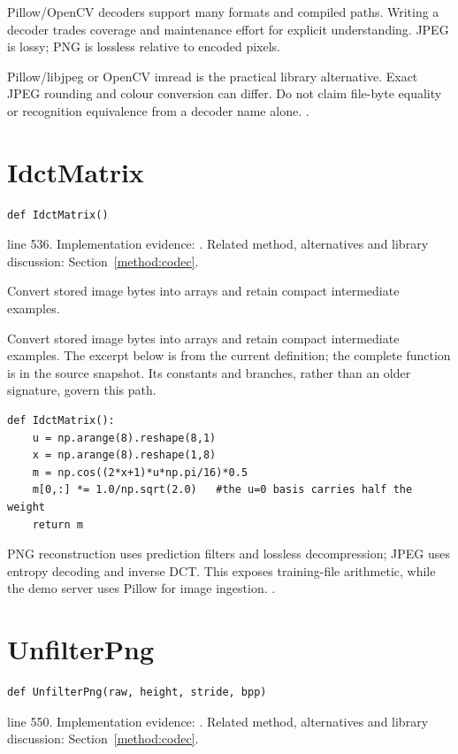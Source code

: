 Pillow/OpenCV decoders support many formats and compiled paths. Writing a decoder trades coverage and maintenance effort for explicit understanding. JPEG is lossy; PNG is lossless relative to encoded pixels.


Pillow/libjpeg or OpenCV imread is the practical library alternative. Exact JPEG rounding and colour conversion can differ. Do not claim file-byte equality or recognition equivalence from a decoder name alone. \cite{pngspec,jpegspec,pillowimage}.


\section{IdctMatrix}\label{fn:train:IdctMatrix}
\begin{lstlisting}[style=sig]
def IdctMatrix()
\end{lstlisting}
 line 536. Implementation evidence: \cite{code2026}. Related method, alternatives and library discussion: Section~\ref{method:codec}.


Convert stored image bytes into arrays and retain compact intermediate examples.


Convert stored image bytes into arrays and retain compact intermediate examples. The excerpt below is from the current definition; the complete function is in the source snapshot. Its constants and branches, rather than an older signature, govern this path.


\begin{lstlisting}[style=plain]
def IdctMatrix():
    u = np.arange(8).reshape(8,1)
    x = np.arange(8).reshape(1,8)
    m = np.cos((2*x+1)*u*np.pi/16)*0.5
    m[0,:] *= 1.0/np.sqrt(2.0)   #the u=0 basis carries half the weight
    return m
\end{lstlisting}
PNG reconstruction uses prediction filters and lossless decompression; JPEG uses entropy decoding and inverse DCT. This exposes training-file arithmetic, while the demo server uses Pillow for image ingestion. \cite{pngspec,jpegspec,pillowimage}.


\section{UnfilterPng}\label{fn:train:UnfilterPng}
\begin{lstlisting}[style=sig]
def UnfilterPng(raw, height, stride, bpp)
\end{lstlisting}
 line 550. Implementation evidence: \cite{code2026}. Related method, alternatives and library discussion: Section~\ref{method:codec}.


